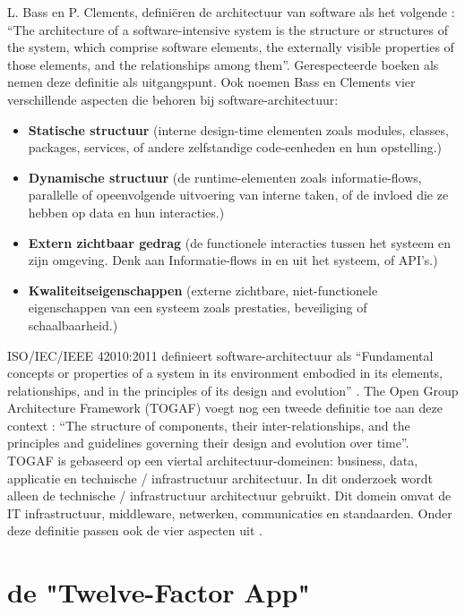 L. Bass en P. Clements, definiëren de architectuur van software als het volgende \parencite{ArchitectureInPractice}: \enquote{The architecture of a software-intensive system is the structure or structures of the system, which comprise software elements, the externally visible properties of those elements, and the relationships among them}. Gerespecteerde boeken als \parencite{ArchitectureStakeholders, DesigningArchitectures} nemen deze definitie als uitgangspunt. Ook noemen Bass en Clements vier verschillende aspecten die behoren bij software-architectuur:
\begin{itemize}
	\item \textbf{Statische structuur} (interne design-time elementen zoals modules, classes, packages, services, of andere zelfstandige code-eenheden en hun opstelling.)
	\item \textbf{Dynamische structuur} (de runtime-elementen zoals informatie-flows, parallelle of opeenvolgende uitvoering van interne taken, of de invloed die ze hebben op data en hun interacties.)
	\item \textbf{Extern zichtbaar gedrag} (de functionele interacties tussen het systeem en zijn omgeving. Denk aan Informatie-flows in en uit het systeem, of API's.)
	\item \textbf{Kwaliteitseigenschappen} (externe zichtbare, niet-functionele eigenschappen van een systeem zoals prestaties, beveiliging of schaalbaarheid.)
\end{itemize}

ISO/IEC/IEEE 42010:2011 definieert software-architectuur als \enquote{Fundamental concepts or properties of a system in its environment embodied in its elements, relationships, and in the principles of its design and evolution} \parencite{IEEEArchitecture}. The Open Group Architecture Framework (TOGAF) voegt nog een tweede definitie toe aan deze context \parencite{ArchitectureTOGAF}: \enquote{The structure of components, their inter-relationships, and the principles and guidelines governing their design and evolution over time}. TOGAF is gebaseerd op een viertal architectuur-domeinen: business, data, applicatie en technische / infrastructuur architectuur. In dit onderzoek wordt alleen de technische / infrastructuur architectuur gebruikt. Dit domein omvat de IT infrastructuur, middleware, netwerken, communicaties en standaarden. Onder deze definitie passen ook de vier aspecten uit \parencite{ArchitectureInPractice}.

\section{de "Twelve-Factor App"}

